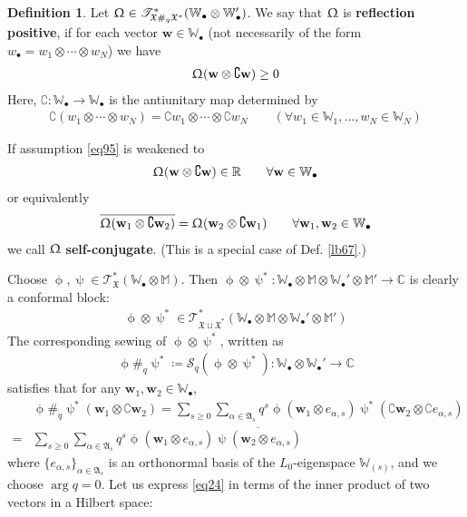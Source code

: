 \documentclass[11pt,b5paper,notitlepage]{article}
\theoremstyle{definition}
\newtheorem{df}{Definition}[section]
\theoremstyle{plain}
\newcommand{\fk}{\mathfrak}
\newcommand{\mc}{\mathcal}
\newcommand{\ovl}{\overline}
\newcommand{\scr}{\mathscr}
\newcommand{\Co}{\complement}
\newcommand{\blt}{\bullet}
\newcommand{\Wbb}{\mathbb W}
\newcommand{\Mbb}{\mathbb M}
\newcommand{\Cbb}{\mathbb C}
\newcommand{\Rbb}{\mathbb R}
\newcommand{\wbf}{\mathbf w}
\numberwithin{equation}{section}
\begin{document}
\begin{df}\label{lb33}
Let $\Upomega\in\scr T_{\fk X\#_q\fk X^*}^*(\Wbb_\blt\otimes\Wbb_\blt')$. We say that $\Upomega$ is \textbf{reflection positive}, if for each vector $\wbf\in\Wbb_\blt$ (not necessarily of the form $w_\blt=w_1\otimes\cdots\otimes w_N$) we have
\begin{align}
\Upomega(\wbf\otimes \Co\wbf)\geq0  \label{eq95}
\end{align}
Here, $\Co:\Wbb_\blt\rightarrow\Wbb_\blt$ is the antiunitary map determined by
\begin{align*}
\Co(w_1\otimes\cdots\otimes w_N)=\Co w_1\otimes\cdots\otimes\Co w_N\qquad(\forall w_1\in\Wbb_1,\dots,w_N\in\Wbb_N)
\end{align*}

If assumption \eqref{eq95} is weakened to
\begin{align}
\Upomega(\wbf\otimes \Co\wbf)\in\Rbb\qquad\forall \wbf\in\Wbb_\blt
\end{align} 
or equivalently
\begin{align}
\ovl{\Upomega(\wbf_1\otimes\Co\wbf_2)}=\Upomega(\wbf_2\otimes\Co\wbf_1)\qquad\forall \wbf_1,\wbf_2\in\Wbb_\blt
\end{align}
we call $\Upomega$ \textbf{self-conjugate}. (This is a special case of Def. \ref{lb67}.) \hfill\qedsymbol
\end{df}



Choose $\upphi,\uppsi\in\scr T_{\fk X}^*(\Wbb_\blt\otimes\Mbb)$. Then $\upphi\otimes\uppsi^*:\Wbb_\blt\otimes\Mbb\otimes\Wbb_\blt'\otimes\Mbb'\rightarrow\Cbb$ is clearly a conformal block:
\begin{align*}
\upphi\otimes\uppsi^*\in\scr T_{\fk X\sqcup\fk X^*}^*(\Wbb_\blt\otimes\Mbb\otimes\Wbb_\blt'\otimes\Mbb')
\end{align*}
The corresponding sewing of $\upphi\otimes\uppsi^*$, written as \index{zz@$\upphi\#_q\uppsi^*=\mc S_q(\upphi\otimes\uppsi^*)$}
\begin{align*}
\upphi\#_q\uppsi^*\coloneq \mc S_q(\upphi\otimes\uppsi^*):\Wbb_\blt\otimes\Wbb_\blt'\rightarrow\Cbb
\end{align*}
satisfies that for any $\wbf_1,\wbf_2\in\Wbb_\blt$,
\begin{align}\label{eq24}
&\upphi\#_q\uppsi^*(\wbf_1\otimes \Co\wbf_2)=\sum_{s\geq 0}\sum_{\alpha\in\fk A_s} q^s\upphi(\wbf_1\otimes e_{\alpha,s})\uppsi^*(\Co\wbf_2\otimes \Co e_{\alpha,s})\nonumber\\
=&\sum_{s\geq 0}\sum_{\alpha\in\fk A_s} q^s\upphi(\wbf_1\otimes e_{\alpha,s})\ovl{\uppsi(\wbf_2\otimes e_{\alpha,s})}
\end{align}
where $\{e_{\alpha,s}\}_{\alpha\in\fk A_s}$ is an orthonormal basis of the $L_0$-eigenspace $\Wbb_{(s)}$, and we choose $\arg q=0$. Let us express \eqref{eq24} in terms of the inner product of two vectors in a Hilbert space:
\end{document}
